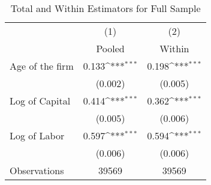 \begin{table}[htbp]\centering
\def\sym#1{\ifmmode^{#1}\else\(^{#1}\)\fi}
\caption{Total and Within Estimators for Full Sample}
\begin{tabular}{l*{2}{c}}
\toprule
                    &\multicolumn{1}{c}{(1)}&\multicolumn{1}{c}{(2)}\\
                    &\multicolumn{1}{c}{Pooled}&\multicolumn{1}{c}{Within}\\
\midrule
Age of the firm     &       0.133\sym{***}&       0.198\sym{***}\\
                    &     (0.002)         &     (0.005)         \\
\addlinespace
Log of Capital      &       0.414\sym{***}&       0.362\sym{***}\\
                    &     (0.005)         &     (0.006)         \\
\addlinespace
Log of Labor        &       0.597\sym{***}&       0.594\sym{***}\\
                    &     (0.006)         &     (0.006)         \\
\midrule
Observations        &       39569         &       39569         \\
\bottomrule
\end{tabular}
\end{table}

